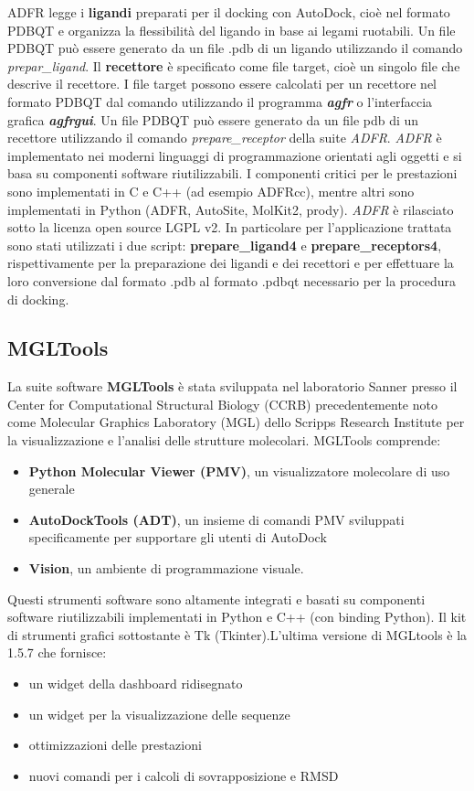 \noindent ADFR legge i \textbf{ligandi} preparati per il docking con AutoDock, cioè nel formato PDBQT e organizza la flessibilità del ligando in base ai legami ruotabili. Un file PDBQT può essere generato da un file .pdb di un ligando utilizzando il comando \textit{prepar\_ligand}.  Il \textbf{recettore} è specificato come file target, cioè un singolo file che descrive il recettore. I file target possono essere calcolati per un recettore nel formato PDBQT dal comando utilizzando il programma \textit{\textbf{agfr}} o l'interfaccia grafica \textit{\textbf{agfrgui}}. Un file PDBQT può essere generato da un file pdb di un recettore utilizzando il comando \textit{prepare\_receptor} della suite \textit{ADFR}. \newline
\textit{ADFR} è implementato nei moderni linguaggi di programmazione orientati agli oggetti e si basa su componenti software riutilizzabili. I componenti critici per le prestazioni sono implementati in C e C++ (ad esempio ADFRcc), mentre altri sono implementati in Python (ADFR, AutoSite, MolKit2, prody). \textit{ADFR} è rilasciato sotto la licenza open source LGPL v2.\newline 
In particolare per l'applicazione trattata sono stati utilizzati i due script: \textbf{prepare\_ligand4} e \textbf{prepare\_receptors4}, rispettivamente per la preparazione dei ligandi e dei recettori e per effettuare la loro conversione dal formato .pdb al formato .pdbqt necessario per la procedura di docking.

\subsection{MGLTools}
\def\baselinestretch{1.66}
\noindent La suite software \textbf{MGLTools} è stata sviluppata nel laboratorio Sanner presso il Center for Computational Structural Biology (CCRB) precedentemente noto come Molecular Graphics Laboratory (MGL) dello Scripps Research Institute per la visualizzazione e l'analisi delle strutture molecolari. MGLTools comprende:
\begin{itemize}
    \item \textbf{Python Molecular Viewer (PMV)}, un visualizzatore molecolare di uso generale
    \item \textbf{AutoDockTools (ADT)}, un insieme di comandi PMV sviluppati specificamente per supportare gli utenti di AutoDock
    \item \textbf{Vision}, un ambiente di programmazione visuale.
\end{itemize}
\noindent Questi strumenti software sono altamente integrati e basati su componenti software riutilizzabili implementati in Python e C++ (con binding Python). Il kit di strumenti grafici sottostante è Tk (Tkinter).L'ultima versione di MGLtools è la 1.5.7 che fornisce:
\begin{itemize}
    \item un widget della dashboard ridisegnato
    \item un widget per la visualizzazione delle sequenze
    \item ottimizzazioni delle prestazioni
    \item nuovi comandi per i calcoli di sovrapposizione e RMSD
\end{itemize}

